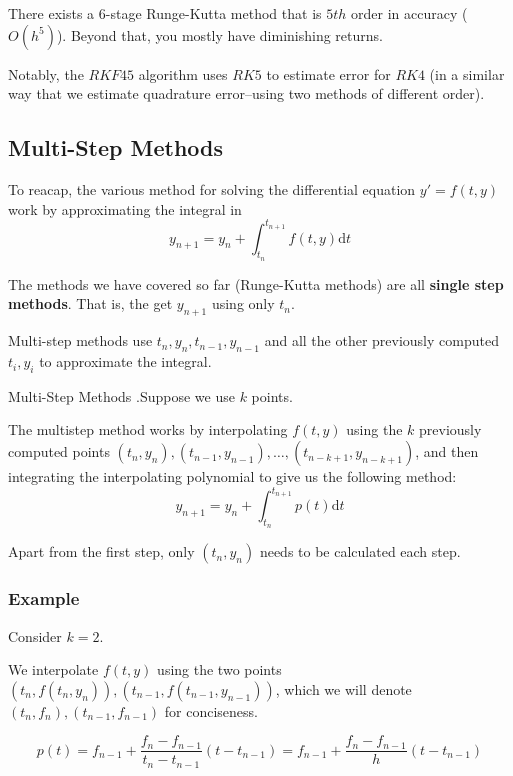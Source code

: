 \documentclass[12pt,letterpaper]{article}
\newcommand{\dd}{\mathrm{d}}
\begin{document}
There exists a 6-stage Runge-Kutta method that is $5th$ order in accuracy ($O(h^5)$). Beyond that, you mostly have diminishing returns.

Notably, the $RKF45$ algorithm uses $RK5$ to estimate error for $RK4$ (in a similar way that we estimate quadrature error--using two methods of different order).


\subsection{Multi-Step Methods}

To reacap, the various method for solving the differential equation $y' = f(t,y)$ work by approximating the integral in
\begin{equation}
	y_{n+1} = y_n + \int_{t_n}^{t_{n+1}} f(t,y) \dd t
\end{equation}

The methods we have covered so far (Runge-Kutta methods) are all \textbf{single step methods}. That is, the get $y_{n+1}$ using only $t_n$.

Multi-step methods use $t_n, y_n, t_{n-1}, y_{n-1}$ and all the other previously computed $t_i, y_i$ to approximate the integral.

\begin{algo}{Multi-Step Methods}
.Suppose we use $k$ points.

The multistep method works by interpolating $f(t,y)$ using the $k$ previously computed points $(t_n, y_n), (t_{n-1}, y_{n-1}), \dots, (t_{n-k+1}, y_{n-k+1})$, and then integrating the interpolating polynomial to give us the following method:
\begin{equation}
	y_{n+1} = y_n + \int_{t_n}^{t_{n+1}} p(t) \dd t
\end{equation}
\end{algo}

Apart from the first step, only $(t_n, y_n)$ needs to be calculated each step.

\subsubsection{Example}

Consider $k=2$.

We interpolate $f(t,y)$ using the two points $(t_n, f(t_n, y_n)), (t_{n-1}, f(t_{n-1}, y_{n-1}))$, which we will denote $(t_n, f_n), (t_{n-1}, f_{n-1})$ for conciseness.

\begin{equation}
	p(t) = f_{n-1} + \frac{f_n - f_{n-1}}{t_n - t_{n-1}} (t-t_{n-1}) = f_{n-1} + \frac{f_n - f_{n-1}}{h} (t-t_{n-1})
\end{equation}
\end{document}
